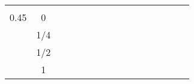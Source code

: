 \documentclass{article}
\begin{document}
\begin{table}[]
\begin{tabular}{@{}cccccccccccccccc@{}}
     &                       &           &           &           &          &  &           &           &           &          &  &           &           &           &          \\
0.45 & 0                     &           &           &           &          &  &           &           &           &          &  &           &           &           &          \\
     & 1/4                   &           &           &           &          &  &           &           &           &          &  &           &           &           &          \\
     & 1/2                   &           &           &           &          &  &           &           &           &          &  &           &           &           &          \\
     & 1                     &           &           &           &          &  &           &           &           &          &  &           &           &           &          \\ \bottomrule
\end{tabular}
\end{table}
\end{document}
